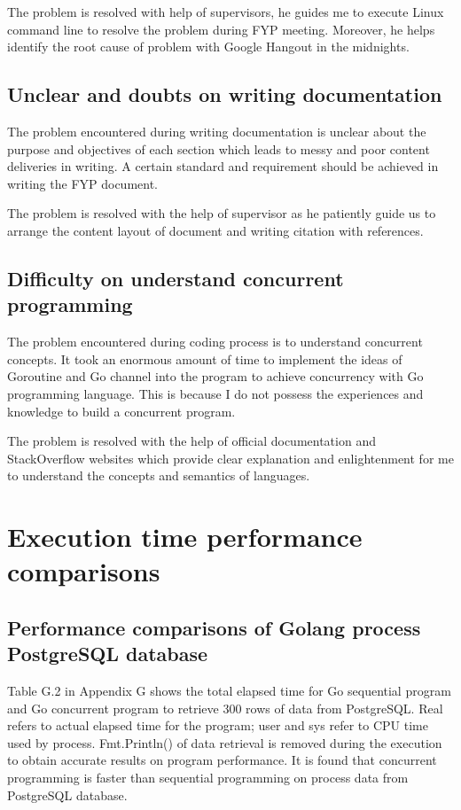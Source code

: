 The problem is resolved with help of supervisors, he guides me to execute Linux command line to resolve the problem during FYP meeting. Moreover, he helps identify the root cause of problem with Google Hangout in the midnights. 

\subsection{Unclear and doubts on writing documentation}

The problem encountered during writing documentation is unclear about the purpose and objectives of each section which leads to messy and poor content deliveries in writing. A certain standard and requirement should be achieved in writing the FYP document.

The problem is resolved with the help of supervisor as he patiently guide us to arrange the content layout of document and writing citation with references.  

\subsection{Difficulty on understand concurrent programming}

The problem encountered during coding process is to understand concurrent concepts. It took an enormous amount of time to implement the ideas of Goroutine and Go channel into the program to achieve concurrency with Go programming language. This is because I do not possess the experiences and knowledge to build a concurrent program.

The problem is resolved with the help of official documentation and StackOverflow websites which provide clear explanation and enlightenment for me to understand the concepts and semantics of languages. 

\section{Execution time performance comparisons}

\subsection{Performance comparisons of Golang process PostgreSQL database}

Table G.2 in Appendix G shows the total elapsed time for Go sequential program and Go concurrent program to retrieve 300 rows of data from PostgreSQL. Real refers to actual elapsed time for the program; user and sys refer to CPU time used by process. Fmt.Println() of data retrieval is removed during the execution to obtain accurate results on program performance. It is found that concurrent programming is faster than sequential programming on process data from PostgreSQL database. 

